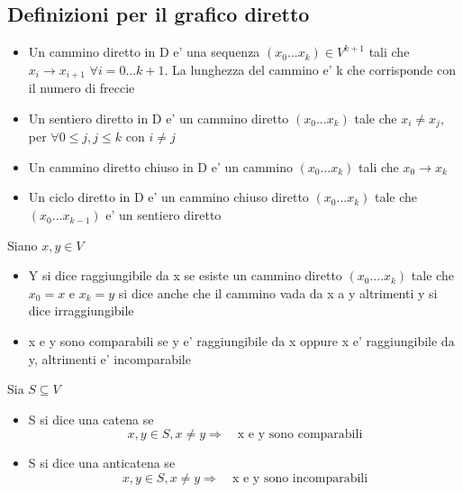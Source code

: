 \documentclass{article}
\begin{document}
        \subsection*{Definizioni per il grafico diretto}
        \begin{itemize}
          \item Un cammino diretto in D e' una sequenza $(x_0...x_k)\in V^{k+1}$ tali che $x_i \to x_{i+1}$ $\forall i=0...k+1$. La lunghezza del cammino e' k che corrisponde con il numero di freccie
          \item Un sentiero diretto in D e' un cammino diretto $(x_0...x_k)$ tale che $x_i\neq x_j$, per $\forall 0 \leq j, j\leq k$ con $i\neq j$
          \item Un cammino diretto chiuso in D e' un cammino $(x_0...x_k)$ tali che $x_0 \to x_k$
          \item Un ciclo diretto in D e' un cammino chiuso diretto $(x_0...x_k)$ tale che $(x_0...x_{k-1})$ e' un sentiero diretto
        \end{itemize}
        \begin{flushleft}
          Siano $x,y \in V$
        \end{flushleft}
        \begin{itemize}
          \item Y si dice raggiungibile da x se esiste un cammino diretto $(x_0....x_k)$ tale che $x_0=x$  e $x_k=y$
            si dice anche che il cammino vada  da x a y altrimenti y si dice irraggiungibile
          \item x e y sono comparabili se y e' raggiungibile da x oppure x e' raggiungibile da y, altrimenti e' incomparabile
        \end{itemize}
        \begin{flushleft}
          Sia $S \subseteq V$
        \end{flushleft}
        \begin{itemize}
          \item S si dice una catena se 
            \begin{equation*}
              x,y \in S, x\neq y \Rightarrow \quad \text{x e y sono comparabili}
            \end{equation*}
          \item S si dice una anticatena se 
            \begin{equation*}
              x,y \in S, x\neq y \Rightarrow \quad \text{x e y sono incomparabili}
            \end{equation*}
        \end{itemize}
\end{document}
